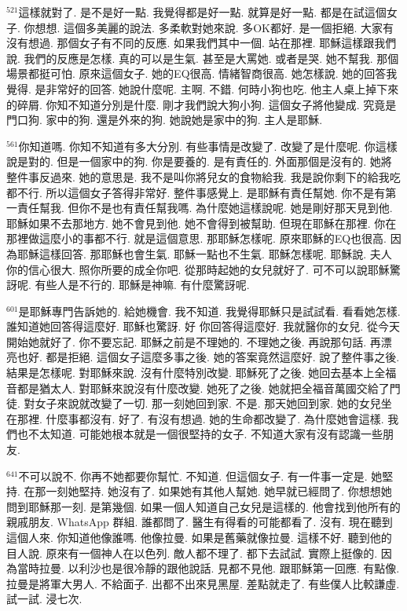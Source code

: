 \documentclass{book}
\begin{document}
$^{521}$這樣就對了.
是不是好一點.
我覺得都是好一點.
就算是好一點.
都是在試這個女子.
你想想.
這個多美麗的說法.
多柔軟對她來說.
多OK都好.
是一個拒絕.
大家有沒有想過.
那個女子有不同的反應.
如果我們其中一個.
站在那裡.
耶穌這樣跟我們說.
我們的反應是怎樣.
真的可以是生氣.
甚至是大罵她.
或者是哭.
她不幫我.
那個場景都挺可怕.
原來這個女子.
她的EQ很高.
情緒智商很高.
她怎樣說.
她的回答我覺得.
是非常好的回答.
她說什麼呢.
主啊.
不錯.
何時小狗也吃.
他主人桌上掉下來的碎屑.
你知不知道分別是什麼.
剛才我們說大狗小狗.
這個女子將他變成.
究竟是門口狗.
家中的狗.
還是外來的狗.
她說她是家中的狗.
主人是耶穌.

$^{561}$你知道嗎.
你知不知道有多大分別.
有些事情是改變了.
改變了是什麼呢.
你這樣說是對的.
但是一個家中的狗.
你是要養的.
是有責任的.
外面那個是沒有的.
她將整件事反過來.
她的意思是.
我不是叫你將兒女的食物給我.
我是說你剩下的給我吃都不行.
所以這個女子答得非常好.
整件事感覺上.
是耶穌有責任幫她.
你不是有第一責任幫我.
但你不是也有責任幫我嗎.
為什麼她這樣說呢.
她是剛好那天見到他.
耶穌如果不去那地方.
她不會見到他.
她不會得到被幫助.
但現在耶穌在那裡.
你在那裡做這麼小的事都不行.
就是這個意思.
那耶穌怎樣呢.
原來耶穌的EQ也很高.
因為耶穌這樣回答.
那耶穌也會生氣.
耶穌一點也不生氣.
耶穌怎樣呢.
耶穌說.
夫人你的信心很大.
照你所要的成全你吧.
從那時起她的女兒就好了.
可不可以說耶穌驚訝呢.
有些人是不行的.
耶穌是神嘛.
有什麼驚訝呢.

$^{601}$是耶穌專門告訴她的.
給她機會.
我不知道.
我覺得耶穌只是試試看.
看看她怎樣.
誰知道她回答得這麼好.
耶穌也驚訝.
好 你回答得這麼好.
我就醫你的女兒.
從今天開始她就好了.
你不要忘記.
耶穌之前是不理她的.
不理她之後.
再說那句話.
再漂亮也好.
都是拒絕.
這個女子這麼多事之後.
她的答案竟然這麼好.
說了整件事之後.
結果是怎樣呢.
對耶穌來說.
沒有什麼特別改變.
耶穌死了之後.
她回去基本上全福音都是猶太人.
對耶穌來說沒有什麼改變.
她死了之後.
她就把全福音萬國交給了門徒.
對女子來說就改變了一切.
那一刻她回到家.
不是.
那天她回到家.
她的女兒坐在那裡.
什麼事都沒有.
好了.
有沒有想過.
她的生命都改變了.
為什麼她會這樣.
我們也不太知道.
可能她根本就是一個很堅持的女子.
不知道大家有沒有認識一些朋友.

$^{641}$不可以說不.
你再不她都要你幫忙.
不知道.
但這個女子.
有一件事一定是.
她堅持.
在那一刻她堅持.
她沒有了.
如果她有其他人幫她.
她早就已經問了.
你想想她問到耶穌那一刻.
是第幾個.
如果一個人知道自己女兒是這樣的.
他會找到他所有的親戚朋友.
WhatsApp 群組.
誰都問了.
醫生有得看的可能都看了.
沒有.
現在聽到這個人來.
你知道他像誰嗎.
他像拉曼.
如果是舊藥就像拉曼.
這樣不好.
聽到他的目人說.
原來有一個神人在以色列.
敵人都不理了.
都下去試試.
實際上挺像的.
因為當時拉曼.
以利沙也是很冷靜的跟他說話.
見都不見他.
跟耶穌第一回應.
有點像.
拉曼是將軍大男人.
不給面子.
出都不出來見黑屋.
差點就走了.
有些僕人比較謙虛.
試一試.
浸七次.
\end{document}
